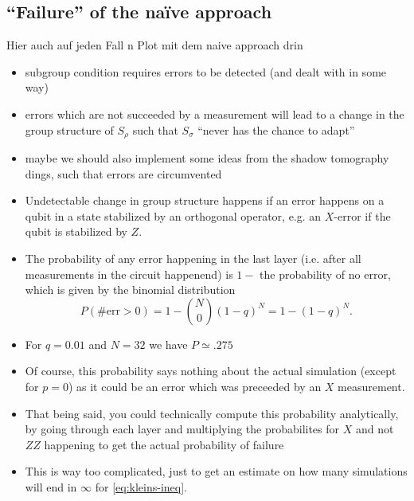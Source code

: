 \subsection{\enquote{Failure} of the na\"ive approach}
Hier auch auf jeden Fall n Plot mit dem naive approach drin
\begin{itemize}
  \item subgroup condition requires errors to be detected (and dealt with in
    some way)
  \item errors which are not succeeded by a measurement will lead to a change
    in the group structure of $S_\rho$ such that $S_\sigma$ \enquote{never has
    the chance to adapt}
  \item maybe we should also implement some ideas from the shadow tomography
    dings, such that errors are circumvented
  \item Undetectable change in group structure happens if an error happens on a
    qubit in a state stabilized by an orthogonal operator, e.g. an $X$-error if
    the qubit is stabilized by $Z$.
  \item The probability of any error happening in the last layer (i.e. after
    all measurements in the circuit happenend) is $1-$ the probability of no
    error, which is given by the binomial distribution
    \[ P(\#\mathrm{err}>0) = 1-\binom{N}{0} (1-q)^N=1-(1-q)^N. \]
  \item For $q=\num{0.01}$ and $N=32$ we have $P\simeq .275$
  \item Of course, this probability says nothing about the actual simulation
    (except for $p=0$) as it could be an error which was preceeded by an $X$
    measurement.
  \item That being said, you could technically compute this probability
    analytically, by going through each layer and multiplying the probabilites
    for \(X\) and not $ZZ$ happening to get the actual probability of failure
   \item This is way too complicated, just to get an estimate on how many
     simulations will end in $\infty$ for \cref{eq:kleins-ineq}. 
\end{itemize}

